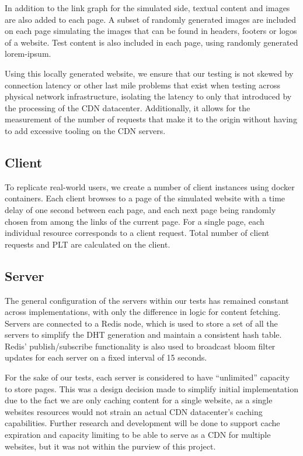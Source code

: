 \documentclass[conference]{IEEEtran}
\begin{document}
In addition to the link graph for the simulated side, textual content and images are also added to each page.  A subset of randomly generated images are included on each page simulating the  images that can be found in headers, footers or logos of a website.  Test content is also included in each page, using randomly generated lorem-ipsum.

Using this locally generated website, we ensure that our testing is not skewed by connection latency or other last mile problems that exist when testing across physical network infrastructure, isolating the latency to only that introduced by the processing of the CDN datacenter.  Additionally, it allows for the measurement of the number of requests that make it to the origin without having to add excessive tooling on the CDN servers.


\subsection*{Client}
To replicate real-world users, we create a number of client instances using docker containers. Each client browses to a page of the simulated website with a time delay of one second between each page, and each next page being randomly chosen from among the links of the current page. For a single page, each individual resource corresponds to a client request. Total number of client requests and PLT are calculated on the client. 
\subsection*{Server}

The general configuration of the servers within our tests has remained constant across implementations, with only the difference in logic for content fetching.  Servers are connected to a Redis node, which is used to store a set of all the servers to simplify the DHT generation and maintain a consistent hash table.  Redis’ publish/subscribe functionality is also used to broadcast bloom filter updates for each server on a fixed interval of 15 seconds.

For the sake of our tests, each server is considered to have “unlimited” capacity to store pages.  This was a design decision made to simplify initial implementation due to the fact we are only caching content for a single website, as a single websites resources would not strain an actual CDN datacenter’s caching capabilities.  Further research and development will be done to support cache expiration and capacity limiting to be able to serve as a CDN for multiple websites, but it was not within the purview of this project. 
\end{document}
